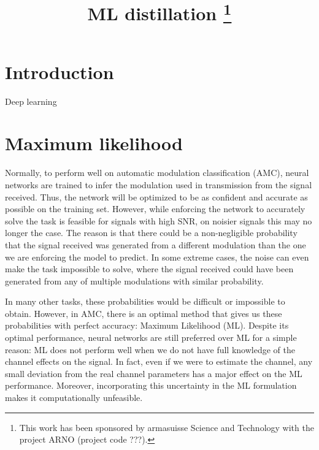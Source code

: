 \documentclass[conference]{IEEEtran}
\title{ML distillation
\thanks{This work has been sponsored by armasuisse Science and Technology with the project ARNO (project code ???).}
}
\author{\IEEEauthorblockN{Javier Maroto}
\IEEEauthorblockA{\textit{Signal Processing Laboratory (LTS4)} \\ \textit{EPFL, Switzerland}}
\and
\IEEEauthorblockN{Gérôme Bovet}
\IEEEauthorblockA{\textit{armasuisse Science\&Technology} \\
\textit{Cyber-Defence Campus, Switzerland}}
\and
\IEEEauthorblockN{Pascal Frossard}
\IEEEauthorblockA{\textit{Signal Processing Laboratory (LTS4)} \\ \textit{EPFL, Switzerland}}}
\begin{document}
\maketitle

\begin{abstract}
\end{abstract}

\begin{IEEEkeywords}
\end{IEEEkeywords}

\section{Introduction}

% 

Deep learning \cite{goodfellow2016deep}

\section{Maximum likelihood}

Normally, to perform well on automatic modulation classification (AMC), neural networks are trained to infer the modulation used in transmission from the signal received. Thus, the network will be optimized to be as confident and accurate as possible on the training set. However, while enforcing the network to accurately solve the task is feasible for signals with high SNR, on noisier signals this may no longer the case. The reason is that there could be a non-negligible probability that the signal received was generated from a different modulation than the one we are enforcing the model to predict. In some extreme cases, the noise can even make the task impossible to solve, where the signal received could have been generated from any of multiple modulations with similar probability.

In many other tasks, these probabilities would be difficult or impossible to obtain. However, in AMC, there is an optimal method that gives us these probabilities with perfect accuracy: Maximum Likelihood (ML). Despite its optimal performance, neural networks are still preferred over ML for a simple reason: ML does not perform well when we do not have full knowledge of the channel effects on the signal. In fact, even if we were to estimate the channel, any small deviation from the real channel parameters has a major effect on the ML performance. Moreover, incorporating this uncertainty in the ML formulation makes it computationally unfeasible.
\end{document}
